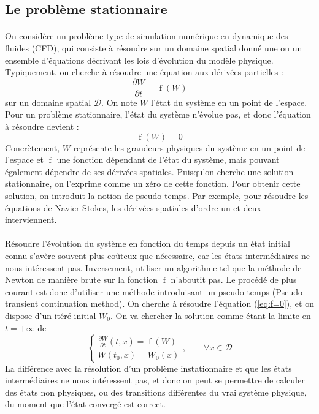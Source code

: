 	\subsection{Le problème stationnaire}

		\paragraph{} On considère un problème type de simulation numérique en dynamique des fluides (CFD), qui consiste à résoudre sur un domaine spatial donné une ou un ensemble d'équations décrivant les lois d'évolution du modèle physique. Typiquement, on cherche à résoudre une équation aux dérivées partielles :
		$$\frac{\partial W}{\partial t} = \operatorname{f}\left(W\right)$$
		sur un domaine spatial $\mathcal{D}$.
		On note $W$ l'état du système en un point de l'espace.
		Pour un problème stationnaire, l'état du système n'évolue pas, et donc l'équation à résoudre devient :
		\begin{equation}\label{eq:f=0}\operatorname{f}\left(W\right) = 0\end{equation}
		Concrètement, $W$ représente les grandeurs physiques du système en un point de l'espace et $\operatorname{f}$ une fonction dépendant de l'état du système, mais pouvant également dépendre de ses dérivées spatiales.
		Puisqu'on cherche une solution stationnaire, on l'exprime comme un zéro de cette fonction.
		Pour obtenir cette solution, on introduit la notion de pseudo-temps\cite{KelleyKeyes1996}.
		Par exemple, pour résoudre les équations de Navier-Stokes, les dérivées spatiales d'ordre un et deux interviennent.

		\paragraph{} Résoudre l'évolution du système en fonction du temps depuis un état initial connu s'avère souvent plus coûteux que nécessaire, car les états intermédiaires ne nous intéressent pas.
		Inversement, utiliser un algorithme tel que la méthode de Newton de manière brute sur la fonction $\operatorname{f}$ n'aboutit pas.
		Le procédé de plus courant est donc  d'utiliser une méthode introduisant un pseudo-temps (Pseudo-transient continuation method).
		On cherche à résoudre l'équation (\ref{eq:f=0}), et on dispose d'un itéré initial $W_0$. On va chercher la solution comme étant la limite en $t = +\infty$ de
		\begin{equation}\label{eq:edp}
			\left\{\begin{aligned}
				\frac{\partial W}{\partial t}\left(t, x\right) = \operatorname{f}\left(W\right) \\
				W\left(t_0, x\right) = W_0\left(x\right)
			\end{aligned}\right.,\qquad \forall x\in\mathcal{D}
		\end{equation}
		La différence avec la résolution d'un problème instationnaire et que les états intermédiaires ne nous intéressent pas, et donc on peut se permettre de calculer des états non physiques, ou des transitions différentes du vrai système physique, du moment que l'état convergé est correct.


